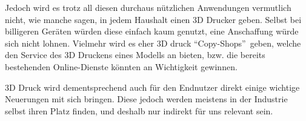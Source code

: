 Jedoch wird es trotz all diesen durchaus nützlichen Anwendungen vermutlich nicht, wie manche sagen, in jedem Haushalt einen 3D Drucker geben. Selbst bei billigeren Geräten würden diese einfach kaum genutzt, eine Anschaffung würde sich nicht lohnen. Vielmehr wird es eher 3D druck \textquotedblleft Copy-Shops\textquotedblright ~geben, welche den Service des 3D Druckens eines Modells an bieten, bzw. die bereits bestehenden Online-Dienste könnten an Wichtigkeit gewinnen.

3D Druck wird dementsprechend auch für den Endnutzer direkt einige wichtige Neuerungen mit sich bringen. Diese jedoch werden meistens in der Industrie selbst ihren Platz finden, und deshalb nur indirekt für uns relevant sein.